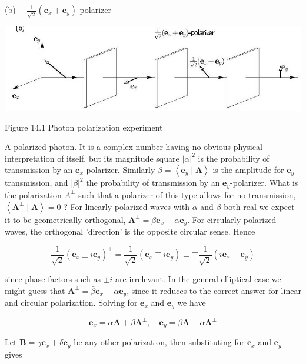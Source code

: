\documentclass[10pt]{article}
\begin{document}
(b) $\quad \frac{1}{\sqrt{2}}\left(\mathbf{e}_{x}+\mathbf{e}_{y}\right)$-polarizer

\begin{center}
\includegraphics[max width=\textwidth]{2023_12_20_5d48e1c38160b1e32b28g-03(1)}
\end{center}

Figure 14.1 Photon polarization experiment

A-polarized photon. It is a complex number having no obvious physical interpretation of itself, but its magnitude square $|\alpha|^{2}$ is the probability of transmission by an $\mathbf{e}_{x}$-polarizer. Similarly $\beta=\left\langle\mathbf{e}_{y} \mid \mathbf{A}\right\rangle$ is the amplitude for $\mathbf{e}_{y}$-transmission, and $|\beta|^{2}$ the probability of transmission by an $\mathbf{e}_{y}$-polarizer. What is the polarization $A^{\perp}$ such that a polarizer of this type allows for no transmission, $\left\langle\mathbf{A}^{\perp} \mid \mathbf{A}\right\rangle=0$ ? For linearly polarized waves with $\alpha$ and $\beta$ both real we expect it to be geometrically orthogonal, $\mathbf{A}^{\perp}=\beta \mathbf{e}_{x}-\alpha \mathbf{e}_{y}$. For circularly polarized waves, the orthogonal 'direction' is the opposite circular sense. Hence

$$
\frac{1}{\sqrt{2}}\left(\mathbf{e}_{x} \pm i \mathbf{e}_{y}\right)^{\perp}=\frac{1}{\sqrt{2}}\left(\mathbf{e}_{x} \mp i \mathbf{e}_{y}\right) \equiv \mp \frac{1}{\sqrt{2}}\left(i \mathbf{e}_{x}-\mathbf{e}_{y}\right)
$$

since phase factors such as $\pm i$ are irrelevant. In the general elliptical case we might guess that $\mathbf{A}^{\perp}=\bar{\beta} \mathbf{e}_{x}-\bar{\alpha} \mathbf{e}_{y}$, since it reduces to the correct answer for linear and circular polarization. Solving for $\mathbf{e}_{x}$ and $\mathbf{e}_{y}$ we have

$$
\mathbf{e}_{x}=\bar{\alpha} \mathbf{A}+\beta \mathbf{A}^{\perp}, \quad \mathbf{e}_{y}=\bar{\beta} \mathbf{A}-\alpha \mathbf{A}^{\perp}
$$

Let $\mathbf{B}=\gamma \mathbf{e}_{x}+\delta \mathbf{e}_{y}$ be any other polarization, then substituting for $\mathbf{e}_{x}$ and $\mathbf{e}_{y}$ gives
\end{document}
